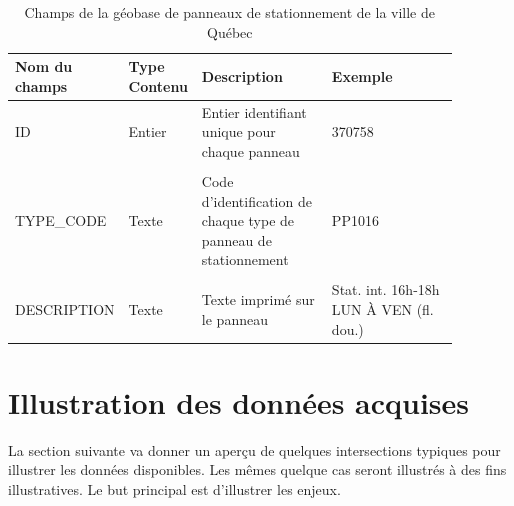 \begin{landscape}
\begin{table}[h!]
  \centering
   \begin{tabular}{p{0.18\linewidth} | p{0.1\linewidth} | p{0.3\linewidth} | p{0.3\linewidth}} 
   \hline
   Nom du champs & Type Contenu & Description  & Exemple\\ 
   \hline
   ID             & Entier    & Entier identifiant unique pour chaque panneau  & 370758 \\ 
   & & & \\
   TYPE\_CODE      & Texte     & Code d'identification de chaque type de panneau de stationnement & PP1016\\
   & & & \\
   DESCRIPTION     & Texte     & Texte imprimé sur le panneau & Stat. int. 16h-18h LUN À VEN (fl. dou.)\\
   \hline
   \end{tabular}
   \caption{Champs de la géobase de panneaux de stationnement de la ville de Québec \parencite{VilledeQuebec:PanneauxSignalisation:2024}}
   \label{tab:champs_geobase_stationnement_quebec}
\end{table}
\end{landscape}

\section{Illustration des données acquises}
La section suivante va donner un aperçu de quelques intersections typiques pour illustrer les données disponibles. Les mêmes quelque cas seront illustrés à des fins illustratives. Le but principal est d'illustrer les enjeux.
